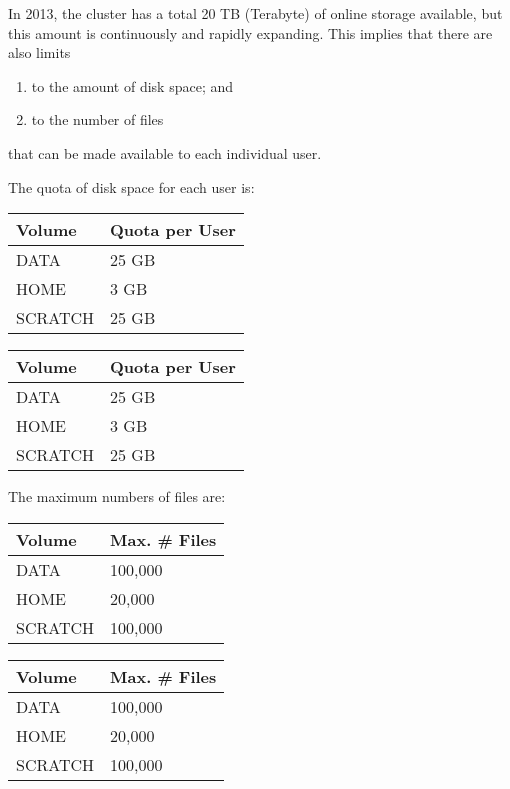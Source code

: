 In 2013, the \hpc cluster has a total 20 TB (Terabyte) of online storage
available, but this amount is continuously and rapidly expanding. This implies
that there are also limits
\fi

\begin{enumerate}
\item  to the amount of disk space; and
\item  to the number of files
\end{enumerate}

that can be made available to each individual \hpc user.

The quota of disk space for each \hpc user is:
\ifantwerpen
\begin{tabular}{|p{0.7in}|p{1.0in}|} \hline
\textbf{Volume} & \textbf{Quota per User} \\ \hline
DATA            & 25 GB \\ \hline
HOME            & 3 GB \\ \hline
SCRATCH         & 25 GB \\ \hline
\end{tabular}
\fi
\ifgent
\begin{tabular}{|p{0.7in}|p{1.0in}|} \hline
\textbf{Volume} & \textbf{Quota per User} \\ \hline
DATA            & 25 GB \\ \hline
HOME            & 3 GB \\ \hline
SCRATCH         & 25 GB \\ \hline
\end{tabular}
\fi

The maximum numbers of files are:
\ifantwerpen
\begin{tabular}{|p{0.7in}|p{1.0in}|} \hline
\textbf{Volume} & \textbf{Max. \# Files} \\ \hline
DATA            & 100,000 \\ \hline
HOME            & 20,000 \\ \hline
SCRATCH         & 100,000 \\ \hline
\end{tabular}
\fi

\ifgent
\begin{tabular}{|p{0.7in}|p{1.0in}|} \hline
\textbf{Volume} & \textbf{Max. \# Files} \\ \hline
DATA            & 100,000 \\ \hline
HOME            & 20,000 \\ \hline
SCRATCH         & 100,000 \\ \hline
\end{tabular}
\fi

